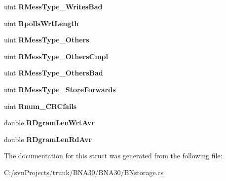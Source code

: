 \begin{DoxyCompactItemize}
uint {\bfseries R\+Mess\+Type\+\_\+\+Writes\+Bad}
\item 
\mbox{\label{struct_b_n_a30_1_1_b_nstorage_1_1_link_statstruct_aa782120de3b1649515f2cde00ad34884}} 
uint {\bfseries Rpolls\+Wrt\+Length}
\item 
\mbox{\label{struct_b_n_a30_1_1_b_nstorage_1_1_link_statstruct_a5c6ebd5099767b2f678d5d447835bdad}} 
uint {\bfseries R\+Mess\+Type\+\_\+\+Others}
\item 
\mbox{\label{struct_b_n_a30_1_1_b_nstorage_1_1_link_statstruct_a529f5dab5904fe14b4ab04fbd3c72fa1}} 
uint {\bfseries R\+Mess\+Type\+\_\+\+Others\+Cmpl}
\item 
\mbox{\label{struct_b_n_a30_1_1_b_nstorage_1_1_link_statstruct_a312b0bef3c36afa40988a9c0cecf957f}} 
uint {\bfseries R\+Mess\+Type\+\_\+\+Others\+Bad}
\item 
\mbox{\label{struct_b_n_a30_1_1_b_nstorage_1_1_link_statstruct_a4dc67332028a9a3222983210204b2547}} 
uint {\bfseries R\+Mess\+Type\+\_\+\+Store\+Forwards}
\item 
\mbox{\label{struct_b_n_a30_1_1_b_nstorage_1_1_link_statstruct_ae32f4ae86e182db6b9138981ef9f659d}} 
uint {\bfseries Rnum\+\_\+\+C\+R\+Cfails}
\item 
\mbox{\label{struct_b_n_a30_1_1_b_nstorage_1_1_link_statstruct_aeb455d8453f13d53105af919dd8885d0}} 
double {\bfseries R\+Dgram\+Len\+Wrt\+Avr}
\item 
\mbox{\label{struct_b_n_a30_1_1_b_nstorage_1_1_link_statstruct_a250f0d27081eb5c3f6f3ccfcfce2398d}} 
double {\bfseries R\+Dgram\+Len\+Rd\+Avr}
\end{DoxyCompactItemize}


The documentation for this struct was generated from the following file\+:\begin{DoxyCompactItemize}
\item 
C\+:/svn\+Projects/trunk/\+B\+N\+A30/\+B\+N\+A30/B\+Nstorage.\+cs\end{DoxyCompactItemize}
